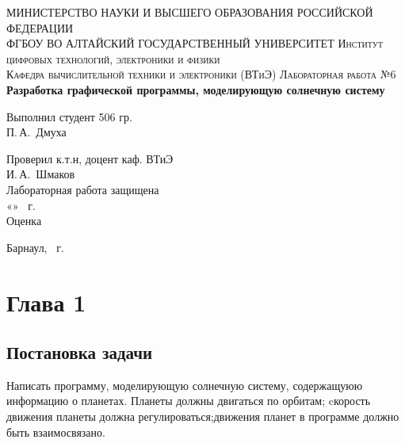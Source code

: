 \documentclass[12pt,a4paper]{extarticle}
\begin{document}
\begin{titlepage}
\begin{center}
\MakeUppercase{Министерство науки и высшего образования Российской Федерации} \\
\MakeUppercase{ФГБОУ ВО АЛТАЙСКИЙ ГОСУДАРСТВЕННЫЙ УНИВЕРСИТЕТ}
\vfill
\textsc{Институт цифровых технологий, электроники и физики} \\

\textsc{Кафедра вычислительной техники и электроники (ВТиЭ)}
\vfill
\textsc{Лабораторная работа №6} \\
\textbf{Разработка графической программы, моделирующую солнечную систему}
\bigskip

\end{center}
\vfill

\newlength{\ML}
\hfill\begin{minipage}{0.5\textwidth}
Выполнил студент 506 гр.\\
\underline{\hspace{4cm}} П.\,А.~Дмуха\\
\end{minipage}%

\hfill\begin{minipage}{0.5\textwidth}
Проверил к.т.н, доцент каф. ВТиЭ\\
\underline{\hspace{4cm}} И.\,А.~Шмаков\\
Лабораторная работа защищена\\
«\underline{\hspace{0.7cm}}» \underline{\hspace{4cm}} \the\year~г. \\
Оценка \underline{\hspace{3.6cm}}
\end{minipage}%
\vfill

\begin{center}
Барнаул, \the\year~г.
\end{center}
\end{titlepage}

\section{Глава 1}
\subsection{Постановка задачи}
Написать программу, моделирующую солнечную систему, содержащуюю информацию о планетах. Планеты должны двигаться по орбитам; cкорость движения планеты должна регулироваться;движения планет в программе должно быть взаимосвязано.
\end{document}
